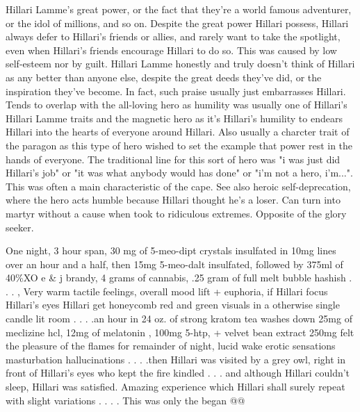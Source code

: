 \documentclass[12pt]{book}
\begin{document}
Hillari Lamme's great power, or the fact that they're a world famous adventurer, or the idol of millions, and so on. Despite the great power Hillari possess, Hillari always defer to Hillari's friends or allies, and rarely want to take the spotlight, even when Hillari's friends encourage Hillari to do so. This was caused by low self-esteem nor by guilt. Hillari Lamme honestly and truly doesn't think of Hillari as any better than anyone else, despite the great deeds they've did, or the inspiration they've become. In fact, such praise usually just embarrasses Hillari. Tends to overlap with the all-loving hero as humility was usually one of Hillari's Hillari Lamme traits and the magnetic hero as it's Hillari's humility to endears Hillari into the hearts of everyone around Hillari. Also usually a charcter trait of the paragon as this type of hero wished to set the example that power rest in the hands of everyone. The traditional line for this sort of hero was "i was just did Hillari's job" or "it was what anybody would has done" or "i'm not a hero, i'm...". This was often a main characteristic of the cape. See also heroic self-deprecation, where the hero acts humble because Hillari thought he's a loser. Can turn into martyr without a cause when took to ridiculous extremes. Opposite of the glory seeker.



One night, 3 hour span, 30 mg of 5-meo-dipt crystals insulfated in 10mg lines over an hour and a half, then 15mg 5-meo-dalt insulfated, followed by 375ml of 40\%XO e \& j brandy, 4 grams of cannabis, .25 gram of full melt bubble hashish . . .  , Very warm tactile feelings, overall mood lift + euphoria, if Hillari focus Hillari's eyes Hillari get honeycomb red and green visuals in a otherwise single candle lit room . . .  .an hour in 24 oz. of strong kratom tea washes down 25mg of meclizine hcl, 12mg of melatonin , 100mg 5-htp, + velvet bean extract 250mg felt the pleasure of the flames for remainder of night, lucid wake erotic sensations masturbation hallucinations . . .  .then Hillari was visited by a grey owl, right in front of Hillari's eyes who kept the fire kindled . . .  and although Hillari couldn't sleep, Hillari was satisfied. Amazing experience which Hillari shall surely repeat with slight variations . . .  . This was only the began @@
\end{document}
